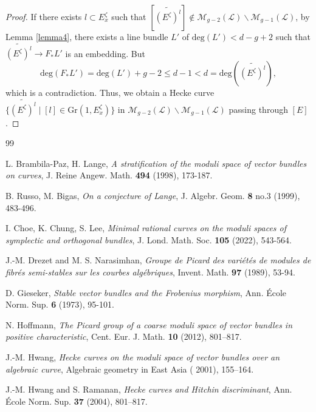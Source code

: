 \documentclass{kms-b}
\numberwithin{equation}{section}
\theoremstyle{plain}
\theoremstyle{definition}
\theoremstyle{remark}
\begin{document}
\begin{proof}
If there exists $l\subset E_x^\zeta$ such that $[\widetilde{(E^\zeta)^l}] \notin \mathcal{M}_{g-2}(\mathcal{L})\backslash\mathcal{M}_{g-1}(\mathcal{L})$, by Lemma \ref{lemma4}, there exists a line bundle $L'$ of $\mathrm{deg}(L')<d-g+2$ such that  $\widetilde{(E^\zeta)^l} \to F_*L'$ is an embedding. But 
$$ \mathrm{deg}(F_*L') = \mathrm{deg}(L') + g-2 \leqslant d-1 < d =\mathrm{deg}(\widetilde{(E^\zeta)^l}),$$
which is a contradiction. Thus, we obtain a Hecke curve $\{\widetilde{(E^\zeta)^l} \mid  [l] \in \mathrm{Gr}(1,E_x^\zeta)\}$ in $\mathcal{M}_{g-2}(\mathcal{L})\backslash\mathcal{M}_{g-1}(\mathcal{L})$ passing through $[E]$.

\end{proof}


\begin{thebibliography}{99}


 L. Brambila-Paz, H. Lange, {\it A stratification of the moduli space of vector bundles on curves}, J. Reine Angew. Math. {\bf 494} (1998), 173-187.

 B. Russo, M. Bigas, {\it On a conjecture of Lange}, J. Algebr. Geom. {\bf 8} no.3 (1999), 483-496.

 I. Choe, K. Chung, S. Lee, {\it Minimal rational curves on the moduli spaces of symplectic and orthogonal bundles}, J. Lond. Math. Soc. {\bf 105} (2022), 543-564.

 J.-M. Drezet and M. S. Narasimhan, {\it Groupe de Picard des variétés de modules de fibrés semi-stables sur les courbes algébriques}, Invent. Math. {\bf 97} (1989), 53-94.

 D. Gieseker, {\it Stable vector bundles and the Frobenius morphism},   Ann. \'{E}cole Norm. Sup. {\bf 6} (1973), 95-101.

 N. Hoffmann, {\it The Picard group of a coarse moduli space of vector bundles in positive characteristic}, Cent. Eur. J. Math. {\bf 10} (2012), 801–817.

 J.-M. Hwang, {\it Hecke curves on the moduli space of vector bundles over an algebraic curve}, Algebraic geometry in East Asia ( 2001), 155–164.

 J.-M. Hwang and S. Ramanan, {\it Hecke curves and  Hitchin discriminant}, Ann. \'{E}cole Norm. Sup. {\bf 37} (2004), 801–817.


\end{thebibliography}
\end{document}
